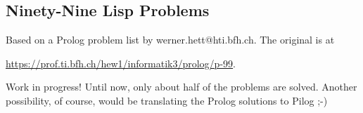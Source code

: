 % 
%
%

\begin{partbacktext}
\part{Ninety-Nine Lisp Problems}
\noindent Based on a Prolog problem list by werner.hett@hti.bfh.ch. The original
is at

\href{https://prof.ti.bfh.ch/hew1/informatik3/prolog/p-99}{https://prof.ti.bfh.ch/hew1/informatik3/prolog/p-99}.

Work in progress! Until now, only about half of the problems are solved.
Another possibility, of course, would be translating the Prolog
solutions to Pilog ;-)
\end{partbacktext}